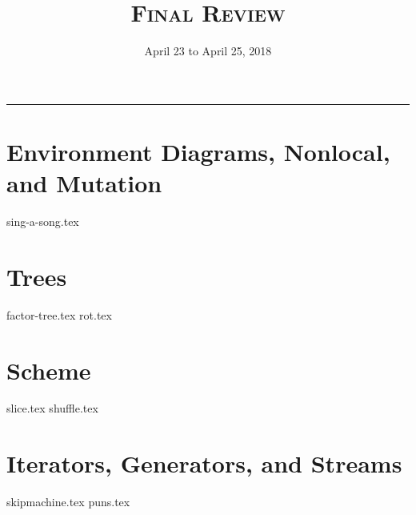 \documentclass{exam}
\title{\textsc{Final Review}}
\date{April 23 to April 25, 2018}
\begin{document}
\maketitle
\rule{\textwidth}{0.15em}
\fontsize{12}{15}\selectfont

\section{Environment Diagrams, Nonlocal, and Mutation}
\begin{questions}
{sing-a-song.tex}
\end{questions}

\newpage
\section{Trees}
\begin{questions}
{factor-tree.tex}
{rot.tex}
\end{questions}
\section{Scheme}
\begin{questions}
{slice.tex}
{shuffle.tex}
\end{questions}

\newpage
\section{Iterators, Generators, and Streams}
\begin{questions}
{skipmachine.tex}
\newpage
{puns.tex}
\end{questions}
\end{document}
